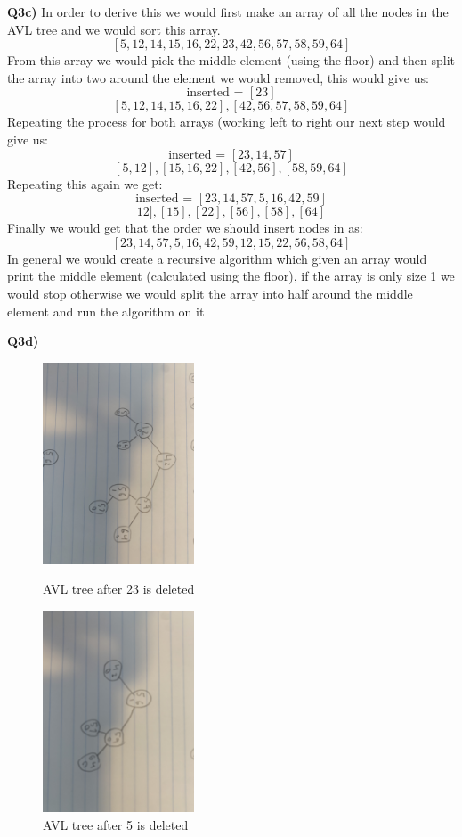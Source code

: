\documentclass[12pt]{article}
\begin{document}
\begin{adjustwidth}{0em}{0pt}
\textbf{Q3c)}
In order to derive this we would first make an array of all the nodes in the AVL tree and we would sort this array.
\[ [5, 12, 14, 15, 16, 22, 23, 42, 56, 57, 58, 59, 64] \]
From this array we would pick the middle element (using the floor) and then split the array into two around the element we would removed, this would give us:
\[ \text{inserted = } [23] \]
\[ [5, 12, 14, 15, 16, 22], [42, 56, 57, 58, 59, 64] \]
Repeating the process for both arrays (working left to right our next step would give us:
\[ \text{inserted = } [23, 14, 57] \]
\[ [5, 12], [15, 16, 22], [42, 56], [58, 59, 64] \]
Repeating this again we get:
\[ \text{inserted = } [23, 14, 57, 5, 16, 42, 59] \]
\[12], [15], [22], [56], [58], [64] \]
Finally we would get that the order we should insert nodes in as:
\[ [23, 14, 57, 5, 16, 42, 59, 12, 15, 22, 56, 58, 64] \]
In general we would create a recursive algorithm which given an array would print the middle element (calculated using the floor), if the array is only size 1 we would stop otherwise we would split the array into half around the middle element and run the algorithm on it
\end{adjustwidth} 
\newpage
\textbf{Q3d)} 
\begin{figure}[tbhp]
	\begin{center}
		\includegraphics[width=0.4\textwidth, angle=90]{3.jpg}
	\end{center}
	\caption{AVL tree after 23 is deleted}
	\label{figcaption}
	\begin{center}
		\includegraphics[width=0.4\textwidth, angle=90]{4.jpg}
	\end{center}
	\caption{AVL tree after 5 is deleted}
	\label{figcaption}
\end{figure}
\end{document}
